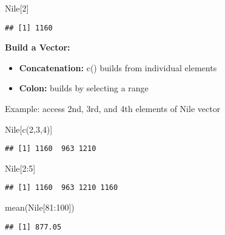 \documentclass[
]{article}
\newenvironment{Shaded}{\begin{snugshade}}{\end{snugshade}}
\newcommand{\DecValTok}[1]{\textcolor[rgb]{0.00,0.00,0.81}{#1}}
\newcommand{\FunctionTok}[1]{\textcolor[rgb]{0.00,0.00,0.00}{#1}}
\newcommand{\NormalTok}[1]{#1}
\newcommand{\SpecialCharTok}[1]{\textcolor[rgb]{0.00,0.00,0.00}{#1}}
\begin{document}
\begin{Shaded}
\begin{Highlighting}[]
\NormalTok{Nile[}\DecValTok{2}\NormalTok{]}
\end{Highlighting}
\end{Shaded}

\begin{verbatim}
## [1] 1160
\end{verbatim}

\textbf{Build a Vector:}

\begin{itemize}
\item
  \textbf{Concatenation:} c() builds from individual elements
\item
  \textbf{Colon:} builds by selecting a range
\end{itemize}

Example: access 2nd, 3rd, and 4th elements of Nile vector

\begin{Shaded}
\begin{Highlighting}[]
\NormalTok{Nile[}\FunctionTok{c}\NormalTok{(}\DecValTok{2}\NormalTok{,}\DecValTok{3}\NormalTok{,}\DecValTok{4}\NormalTok{)]}
\end{Highlighting}
\end{Shaded}

\begin{verbatim}
## [1] 1160  963 1210
\end{verbatim}

\begin{Shaded}
\begin{Highlighting}[]
\NormalTok{Nile[}\DecValTok{2}\SpecialCharTok{:}\DecValTok{5}\NormalTok{]}
\end{Highlighting}
\end{Shaded}

\begin{verbatim}
## [1] 1160  963 1210 1160
\end{verbatim}

\begin{Shaded}
\begin{Highlighting}[]
\FunctionTok{mean}\NormalTok{(Nile[}\DecValTok{81}\SpecialCharTok{:}\DecValTok{100}\NormalTok{])}
\end{Highlighting}
\end{Shaded}

\begin{verbatim}
## [1] 877.05
\end{verbatim}
\end{document}

